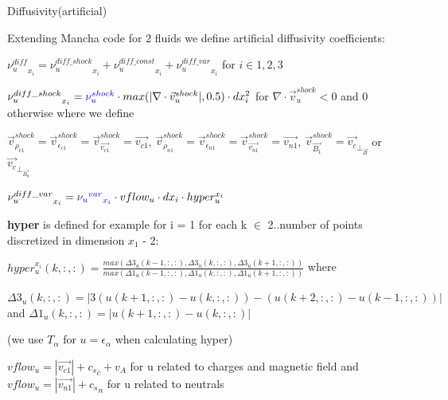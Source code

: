 \documentclass{beamer}
\begin{document}
\begin{frame}{Diffusivity(artificial)}

Extending Mancha code for 2 fluids we define artificial diffusivity coefficients:

${\nu_u^{diff}}_{x_i} = {\nu_u^{diff\_shock}}_{x_i} + {\nu_u^{diff\_const}}_{x_i} +  {\nu_u^{diff\_var}}_{x_i} $ for $i \in 1,2,3$


${\nu_u^{diff\_shock}}_{x_i} = \textcolor{blue}{\nu_u^{shock}} \cdot max(|\nabla \cdot \vec{v}^{shock}_u|,0.5) \cdot dx_i^2$
for $\nabla \cdot \vec{v}^{shock}_u < 0$  and 0 otherwise where we define

$\vec{v}^{shock}_{\rho_{c1}} = \vec{v}^{shock}_{\epsilon_{c1}}= \vec{v}^{shock}_{\vec{v_{c1}}} = \vec{v_{c1}} $, 
$\vec{v}^{shock}_{\rho_{n1}} = \vec{v}^{shock}_{\epsilon_{n1}}= \vec{v}^{shock}_{\vec{v_{n1}}} = \vec{v_{n1}} $,
$\vec{v}^{shock}_{\vec{B_1}} = \vec{v_c}_{\perp_{\vec{B}}}$ or  $\vec{v_c}_{\perp_{\vec{B_0}}}$

${\nu_u^{diff\_var}}_{x_i}  = \textcolor{blue}{{{\nu_u}^{var}}_{x_i}} \cdot  vflow_u \cdot  dx_i \cdot  hyper_u^{x_i}$

\textbf{hyper} is defined for example for i = 1 for each k $\in$ 2..number of points discretized in dimension $x_1$ - 2:

$hyper_u^{x_i}(k,:,:)= \frac{max(\Delta3_u(k-1,:,:),\Delta3_u(k,:,:),\Delta3_u(k+1,:,:))}{max(\Delta1_u(k-1,:,:),\Delta1_u(k,:,:),\Delta1_u(k+1,:,:))}$ where

$\Delta3_u(k,:,:) = |3(u(k+1,:,:) - u(k,:,:)) - (u(k+2,:,:) - u(k-1,:,:)) | $ and $\Delta1_u(k,:,:) = |u(k+1,:,:) - u(k,:,:) | $ 

(we use $T_\alpha$ for $u = \epsilon_\alpha$ when calculating hyper)

$vflow_u = |\vec{v_{c1}}|+ {c_s}_c + v_A$ for u  related to charges and magnetic field and 
$vflow_u = |\vec{v_{n1}}|+ {c_s}_n $ for u  related to neutrals

\end{frame}
\end{document}
